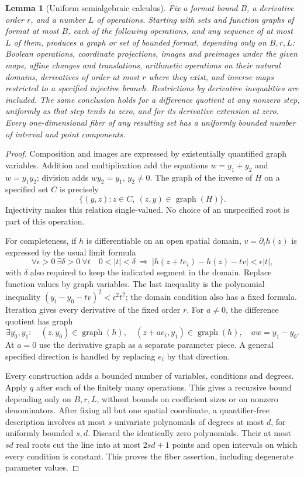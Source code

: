 \documentclass[11pt,a4paper]{article}
\numberwithin{equation}{section}
\newtheorem{lemma}[theorem]{Lemma}
\theoremstyle{remark}
\begin{document}
\begin{lemma}[Uniform semialgebraic calculus]\label{lem:sa-calculus}
Fix a format bound $B$, a derivative order $r$, and a number $L$ of
operations. Starting with sets and function graphs of format at most $B$,
each of the following operations, and any sequence of at most $L$ of them,
produces a graph or set of bounded format, depending only on $B,r,L$:
Boolean operations, coordinate projections, images and preimages under
the given maps, affine changes and translations, arithmetic operations
on their natural domains, derivatives of order at most $r$ where they
exist, and inverse maps restricted to a specified injective branch.
Restrictions by derivative inequalities are included. The same conclusion
holds for a difference quotient at any nonzero step, uniformly as that
step tends to zero, and for its derivative extension at zero.
Every one-dimensional fiber of any resulting set has a uniformly bounded
number of interval and point components.
\end{lemma}
\begin{proof}
Composition and images are expressed by existentially quantified graph
variables. Addition and multiplication add the equations $w=y_1+y_2$
and $w=y_1y_2$; division adds $wy_2=y_1$, $y_2\ne0$.
The graph of the inverse of $H$ on a specified set $C$ is precisely
\[
 \{(y,z):z\in C,\ (z,y)\in\operatorname{graph}(H)\}.
\]
Injectivity makes this relation single-valued. No choice of an unspecified
root is part of this operation.

For completeness, if $h$ is differentiable on an open spatial domain,
$v=\partial_i h(z)$ is expressed by the usual limit formula
\[
 \forall\epsilon>0\ \exists\delta>0\ \forall t\quad
 0<|t|<\delta\ \Longrightarrow\
 |h(z+te_i)-h(z)-tv|<\epsilon|t|,
\]
with $\delta$ also required to keep the indicated segment in the domain.
Replace function values by graph variables. The last inequality is the
polynomial inequality
$(y_t-y_0-tv)^2<\epsilon^2t^2$; the domain condition also has a fixed
formula. Iteration gives every derivative of the fixed order $r$.
For $a\ne0$, the difference quotient has graph
\begin{equation}\label{eq:sa-quotient-graph}
 \exists y_0,y_1:\quad
 (z,y_0)\in\operatorname{graph}(h),\quad
 (z+ae_i,y_1)\in\operatorname{graph}(h),\quad
 aw=y_1-y_0.
\end{equation}
At $a=0$ use the derivative graph as a separate parameter piece. A general
specified direction is handled by replacing $e_i$ by that direction.

Every construction adds a bounded number of variables, conditions and
degrees. Apply $q$ after each of the finitely many operations. This gives
a recursive bound depending only on $B,r,L$, without bounds on coefficient
sizes or on nonzero denominators. After fixing all but one spatial
coordinate, a quantifier-free description involves at most $s$ univariate
polynomials of degrees at most $d$, for uniformly bounded $s,d$.
Discard the identically zero polynomials. Their at most $sd$ real roots
cut the line into at most $2sd+1$ points and open intervals on which every
condition is constant. This proves the fiber assertion, including
degenerate parameter values.
\end{proof}
\end{document}
